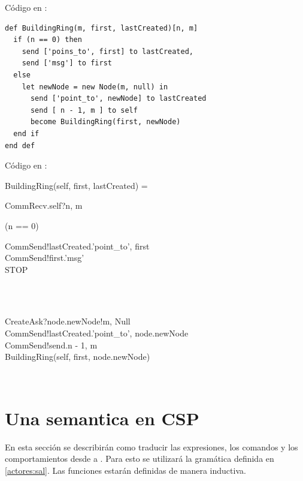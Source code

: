 Código en \SAL:

\begin{lstlisting}[language=sal, style=simple]
def BuildingRing(m, first, lastCreated)[n, m]
  if (n == 0) then
    send ['poins_to', first] to lastCreated,
    send ['msg'] to first
  else
    let newNode = new Node(m, null) in
      send ['point_to', newNode] to lastCreated
      send [ n - 1, m ] to self
      become BuildingRing(first, newNode)
  end if
end def
\end{lstlisting}

Código en \CSP:

\begin{process}
BuildingRing(self, first, lastCreated) = \\ \quad
  \begin{block}
  CommRecv.self?\langle n, m \rangle \then \\ \quad
  \begin{block} 
  \If (n == 0) \Then {} \\ \quad
    \begin{block}
    CommSend!lastCreated.\langle 'point\_to', first \rangle \then \\
    CommSend!first.\langle 'msg' \rangle \then \\
    STOP
    \end{block} \\
  \Else {} \\ \quad
    \begin{block} 
    CreateAsk?node.newNode!\langle m, Null \rangle \then \\
    CommSend!lastCreated.\langle 'point\_to', node.newNode \rangle \then \\
    CommSend!send.\langle n - 1, m \rangle \then \\
    BuildingRing(self, first, node.newNode) 
    \end{block} \\
  \end{block} 
\end{block}
\end{process}

\section{Una semantica en CSP}

En esta sección se describirán como traducir las expresiones, los comandos y los comportamientos desde \SAL a \CSP. Para esto se utilizará la gramática definida en \ref{actores:sal}. Las funciones estarán definidas de manera inductiva.

